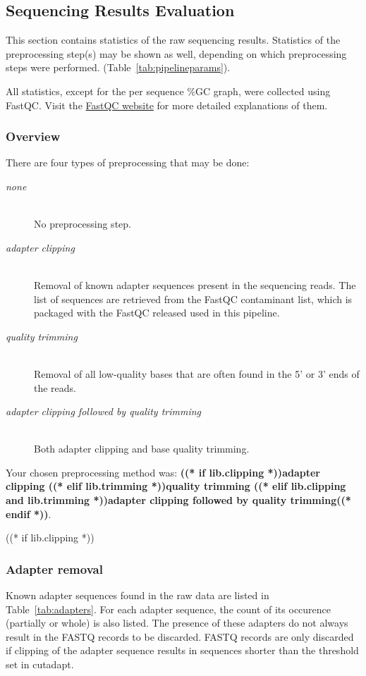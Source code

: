 \subsection{Sequencing Results Evaluation}
\label{sec:seq}

This section contains statistics of the raw sequencing results. Statistics of
the preprocessing step(s) may be shown as well, depending on which preprocessing
steps were performed.
(Table~\ref{tab:pipelineparams}).

\indent

All statistics, except for the per sequence \%GC graph, were collected using
FastQC. Visit the
\href{http://www.bioinformatics.babraham.ac.uk/projects/fastqc/}{FastQC website}
for more detailed explanations of them.

\subsubsection{Overview}
\label{subsec:seq-overview}
There are four types of preprocessing that may be done:

\begin{description}
    \item[\textit{none}] \hfill \\
        No preprocessing step.
    \item[\textit{adapter clipping}] \hfill \\
        Removal of known adapter sequences present in the sequencing
        reads. The list of sequences are retrieved from the FastQC contaminant
        list, which is packaged with the FastQC released used in this pipeline.
    \item[\textit{quality trimming}] \hfill \\
        Removal of all low-quality bases that are often found in the 5'
        or 3' ends of the reads.
    \item[\textit{adapter clipping followed by quality trimming}] \hfill \\
        Both adapter clipping and base quality trimming.
\end{description}
\indent
Your chosen preprocessing method was:\textbf{
((* if lib.clipping *))adapter clipping
((* elif lib.trimming *))quality trimming
((* elif lib.clipping and lib.trimming *))adapter clipping followed by quality trimming((* endif *))}.

((* if lib.clipping *))
\subsubsection{Adapter removal}
Known adapter sequences found in the raw data are listed in
Table~\ref{tab:adapters}. For each adapter sequence, the count of its
occurence (partially or whole) is also listed. The presence of these
adapters do not always result in the FASTQ records to be discarded.
FASTQ records are only discarded if clipping of the adapter sequence
results in sequences shorter than the threshold set in cutadapt.

